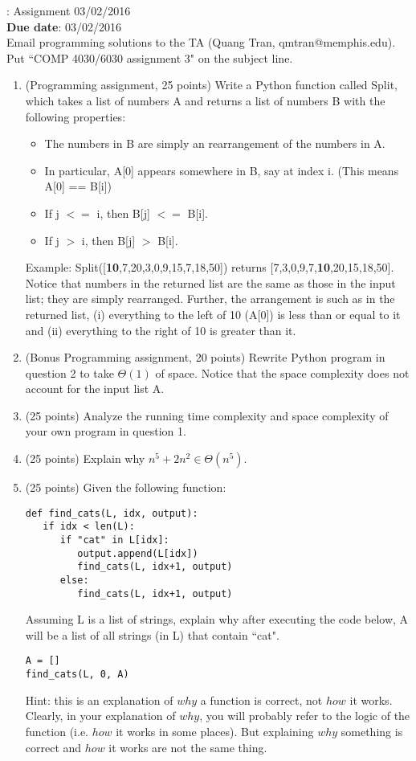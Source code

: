 \documentclass[11pt, oneside]{article}    %
\newcommand{\hw}[2]{\noindent {\bf COMP 4030/6030}: Assignment #2\\
{\bf Due date}: #2\\}
\begin{document}
\hw{1}{03/02/2016}

Email programming solutions to the TA (Quang Tran, qmtran@memphis.edu).  Put ``COMP 4030/6030 assignment 3" on the subject line.
\begin{enumerate}
	\item (Programming assignment, 25 points) Write a Python function called Split, which takes a list of numbers A and returns a list of numbers B with the following properties:
	\begin{itemize}
		\item The numbers in B are simply an rearrangement of the numbers in A.
		\item In particular, A[0] appears somewhere in B, say at index i.  (This means A[0] == B[i])
		\item If j $<=$ i, then B[j] $<=$ B[i].
		\item If j $>$ i, then B[j] $>$ B[i].
	\end{itemize}

Example: Split([{\bf 10},7,20,3,0,9,15,7,18,50]) returns [7,3,0,9,7,{\bf 10},20,15,18,50].  Notice that numbers in the returned list are the same as those in the input list; they are simply rearranged.  Further, the arrangement is such as in the returned list, (i) everything to the left of 10 (A[0]) is less than or equal to it and (ii) everything to the right of 10 is greater than it.
	
	\item (Bonus Programming assignment, 20 points) Rewrite Python program in question 2 to take $\Theta(1)$ of space.  Notice that the space complexity does not account for the input list A.
		
	\item (25 points) Analyze the running time complexity and space complexity of your own program in question 1.

	\item (25 points) Explain why $n^5 + 2n^2 \in \Theta(n^5)$.

	\item (25 points) Given the following function:
\begin{verbatim}
def find_cats(L, idx, output):
   if idx < len(L):
      if "cat" in L[idx]:
         output.append(L[idx])
         find_cats(L, idx+1, output)
      else:
         find_cats(L, idx+1, output)
	\end{verbatim}
Assuming L is a list of strings, explain why after executing the code below, A will be a list of all strings (in L) that contain ``cat". 
\begin{verbatim}
A = []
find_cats(L, 0, A)
\end{verbatim}
 Hint: this is an explanation of $why$ a function is correct, not $how$ it works.  Clearly, in your explanation of $why$, you will probably refer to the logic of the function (i.e. $how$ it works in some places).  But explaining $why$ something is correct and $how$ it works are not the same thing.
\end{enumerate}
\end{document}
